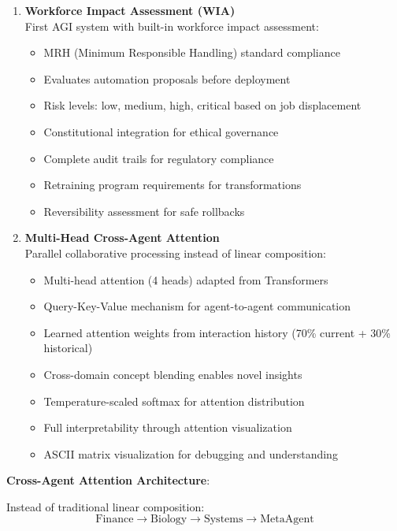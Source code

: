 \documentclass[11pt]{article}
\begin{document}
\begin{enumerate}
    \item \textbf{Workforce Impact Assessment (WIA)} \\
    First AGI system with built-in workforce impact assessment:
    \begin{itemize}
        \item MRH (Minimum Responsible Handling) standard compliance
        \item Evaluates automation proposals before deployment
        \item Risk levels: low, medium, high, critical based on job displacement
        \item Constitutional integration for ethical governance
        \item Complete audit trails for regulatory compliance
        \item Retraining program requirements for transformations
        \item Reversibility assessment for safe rollbacks
    \end{itemize}

    \item \textbf{Multi-Head Cross-Agent Attention} \\
    Parallel collaborative processing instead of linear composition:
    \begin{itemize}
        \item Multi-head attention (4 heads) adapted from Transformers
        \item Query-Key-Value mechanism for agent-to-agent communication
        \item Learned attention weights from interaction history (70\% current + 30\% historical)
        \item Cross-domain concept blending enables novel insights
        \item Temperature-scaled softmax for attention distribution
        \item Full interpretability through attention visualization
        \item ASCII matrix visualization for debugging and understanding
    \end{itemize}
\end{enumerate}

\textbf{Cross-Agent Attention Architecture}:

Instead of traditional linear composition:
\begin{equation}
\text{Finance} \rightarrow \text{Biology} \rightarrow \text{Systems} \rightarrow \text{MetaAgent}
\end{equation}
\end{document}

